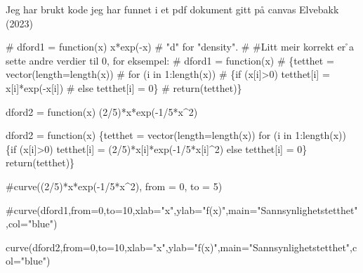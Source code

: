 \documentclass[
  12pt,
  a4paper,
  DIV=11,
  numbers=noendperiod]{scrartcl}
\newenvironment{Shaded}{\begin{snugshade}}{\end{snugshade}}
\newcommand{\AttributeTok}[1]{\textcolor[rgb]{0.40,0.45,0.13}{#1}}
\newcommand{\CommentTok}[1]{\textcolor[rgb]{0.37,0.37,0.37}{#1}}
\newcommand{\ControlFlowTok}[1]{\textcolor[rgb]{0.00,0.23,0.31}{#1}}
\newcommand{\DecValTok}[1]{\textcolor[rgb]{0.68,0.00,0.00}{#1}}
\newcommand{\FunctionTok}[1]{\textcolor[rgb]{0.28,0.35,0.67}{#1}}
\newcommand{\NormalTok}[1]{\textcolor[rgb]{0.00,0.23,0.31}{#1}}
\newcommand{\OtherTok}[1]{\textcolor[rgb]{0.00,0.23,0.31}{#1}}
\newcommand{\SpecialCharTok}[1]{\textcolor[rgb]{0.37,0.37,0.37}{#1}}
\newcommand{\StringTok}[1]{\textcolor[rgb]{0.13,0.47,0.30}{#1}}
\begin{document}
Jeg har brukt kode jeg har funnet i et pdf dokument gitt på canvas
Elvebakk (2023)

\begin{Shaded}
\begin{Highlighting}[]
\CommentTok{\# dford1 = function(x) x*exp({-}x) \# "d" for "density".}
\CommentTok{\# \#Litt meir korrekt er  ̊a sette andre verdier til 0, for eksempel:}
\CommentTok{\# dford1 = function(x)}
\CommentTok{\#   \{tetthet = vector(length=length(x))}
\CommentTok{\# for (i in 1:length(x))}
\CommentTok{\#   \{if (x[i]\textgreater{}0) tetthet[i] = x[i]*exp({-}x[i])}
\CommentTok{\#   else tetthet[i] = 0\}}
\CommentTok{\#   return(tetthet)\}}

\NormalTok{dford2 }\OtherTok{=} \ControlFlowTok{function}\NormalTok{(x) (}\DecValTok{2}\SpecialCharTok{/}\DecValTok{5}\NormalTok{)}\SpecialCharTok{*}\NormalTok{x}\SpecialCharTok{*}\FunctionTok{exp}\NormalTok{(}\SpecialCharTok{{-}}\DecValTok{1}\SpecialCharTok{/}\DecValTok{5}\SpecialCharTok{*}\NormalTok{x}\SpecialCharTok{\^{}}\DecValTok{2}\NormalTok{)}

\NormalTok{dford2 }\OtherTok{=} \ControlFlowTok{function}\NormalTok{(x) \{tetthet }\OtherTok{=} \FunctionTok{vector}\NormalTok{(}\AttributeTok{length=}\FunctionTok{length}\NormalTok{(x))}
\ControlFlowTok{for}\NormalTok{ (i }\ControlFlowTok{in} \DecValTok{1}\SpecialCharTok{:}\FunctionTok{length}\NormalTok{(x))}
\NormalTok{  \{}\ControlFlowTok{if}\NormalTok{ (x[i]}\SpecialCharTok{\textgreater{}}\DecValTok{0}\NormalTok{) tetthet[i] }\OtherTok{=}\NormalTok{ (}\DecValTok{2}\SpecialCharTok{/}\DecValTok{5}\NormalTok{)}\SpecialCharTok{*}\NormalTok{x[i]}\SpecialCharTok{*}\FunctionTok{exp}\NormalTok{(}\SpecialCharTok{{-}}\DecValTok{1}\SpecialCharTok{/}\DecValTok{5}\SpecialCharTok{*}\NormalTok{x[i]}\SpecialCharTok{\^{}}\DecValTok{2}\NormalTok{)}
  \ControlFlowTok{else}\NormalTok{ tetthet[i] }\OtherTok{=} \DecValTok{0}\NormalTok{\}}
  \FunctionTok{return}\NormalTok{(tetthet)\}}


\CommentTok{\#curve((2/5)*x*exp({-}1/5*x\^{}2), from = 0, to = 5)}

\CommentTok{\#curve(dford1,from=0,to=10,xlab="x",ylab="f(x)",main="Sannsynlighetstetthet",col="blue")}

\FunctionTok{curve}\NormalTok{(dford2,}\AttributeTok{from=}\DecValTok{0}\NormalTok{,}\AttributeTok{to=}\DecValTok{10}\NormalTok{,}\AttributeTok{xlab=}\StringTok{"x"}\NormalTok{,}\AttributeTok{ylab=}\StringTok{"f(x)"}\NormalTok{,}\AttributeTok{main=}\StringTok{"Sannsynlighetstetthet"}\NormalTok{,}\AttributeTok{col=}\StringTok{"blue"}\NormalTok{)}
\end{Highlighting}
\end{Shaded}
\end{document}
